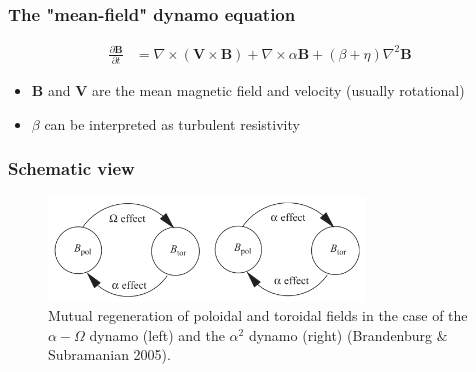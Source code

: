 \documentclass[10pt,aspectratio=169]{beamer}
\begin{document}
\begin{frame}
	\frametitle{The "mean-field" dynamo equation} 
	\begin{align}
	\frac{\partial \mathbf{B}}{\partial t} &= \nabla \times \left( \mathbf{V} \times \mathbf{B} \right) + \nabla \times \alpha \mathbf{B} 
	+ (\beta+\eta) \nabla^2 \mathbf{B}
	\end{align}
	\begin{itemize}
		\item $\mathbf{B}$ and $\mathbf{V}$ are the mean magnetic field and velocity (usually rotational)
		\item $\beta$ can be interpreted as turbulent resistivity
	\end{itemize}
\end{frame}
\begin{frame}
	\frametitle{Schematic view} 
		\begin{figure}
			\includegraphics[width=0.75\textwidth]{./images/alpha_omega.png}
			\caption{Mutual regeneration of poloidal and toroidal fields in the case of the $\alpha-\Omega$ dynamo (left) and the $\alpha^2$ dynamo (right) (Brandenburg $\&$ Subramanian 2005).}
		\end{figure}
	\end{frame}
\end{document}
